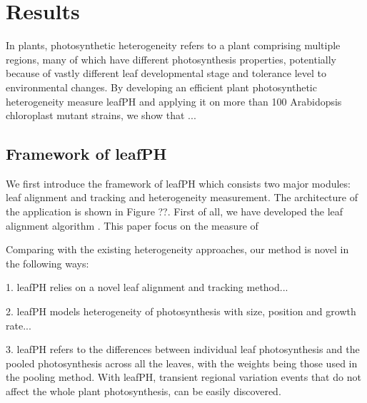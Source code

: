 {%

\section*{Results}

In plants, photosynthetic heterogeneity refers to a plant comprising multiple regions, many of which have different photosynthesis properties, potentially because of vastly different leaf developmental stage and tolerance level to environmental changes. By developing an efficient plant photosynthetic heterogeneity measure leafPH and applying it on more than 100 Arabidopsis chloroplast mutant strains, we show that ...

\subsection*{Framework of leafPH} \label{sec:leafPH}

We first introduce the framework of leafPH which consists two major modules: leaf alignment and tracking and heterogeneity measurement. The architecture of the application is shown in Figure ??. First of all, we have developed the leaf alignment algorithm \cite{yin2014}. This paper focus on the measure of 

Comparing with the existing heterogeneity approaches, our method is novel in the following ways:

1.	leafPH relies on a novel leaf alignment and tracking method... %

2. leafPH models heterogeneity of photosynthesis with size, position and growth rate...

3. leafPH refers to the differences between individual leaf photosynthesis and the pooled photosynthesis across all the leaves, with the weights being those used in the pooling method. With leafPH, transient regional variation events that do not affect the whole plant photosynthesis, can be easily discovered.

}
